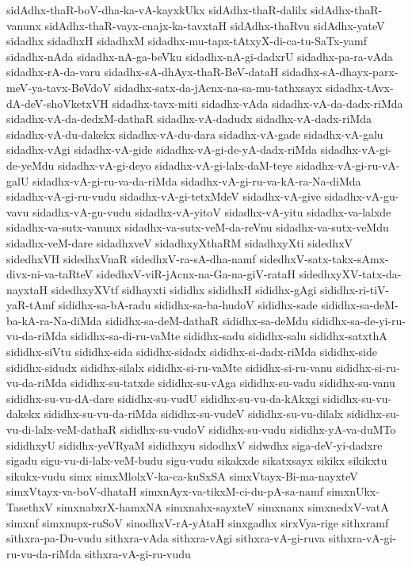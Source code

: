 {sidAdhx-thaR-boV-dha-ka-vA-kayxkUkx
sidAdhx-thaR-dalilx
sidAdhx-thaR-vanunx
sidAdhx-thaR-vayx-cnajx-ka-tavxtaH
sidAdhx-thaRvu
sidAdhx-yateV
sidadhx
sidadhxH
sidadhxM
sidadhx-mu-tapx-tAtxyX-di-ca-tu-SaTx-yamf
sidadhx-nAda
sidadhx-nA-ga-beVku
sidadhx-nA-gi-dadxrU
sidadhx-pa-ra-vAda
sidadhx-rA-da-varu
sidadhx-sA-dhAyx-thaR-BeV-dataH
sidadhx-sA-dhayx-parx-meV-ya-tavx-BeVdoV
sidadhx-satx-da-jAcnx-na-sa-mu-tathxsayx
sidadhx-tAvx-dA-deV-shoVketxVH
sidadhx-tavx-miti
sidadhx-vAda
sidadhx-vA-da-dadx-riMda
sidadhx-vA-da-dedxM-dathaR
sidadhx-vA-dadudx
sidadhx-vA-dadx-riMda
sidadhx-vA-du-dakekx
sidadhx-vA-du-dara
sidadhx-vA-gade
sidadhx-vA-galu
sidadhx-vAgi
sidadhx-vA-gide
sidadhx-vA-gi-de-yA-dadx-riMda
sidadhx-vA-gi-de-yeMdu
sidadhx-vA-gi-deyo
sidadhx-vA-gi-lalx-daM-teye
sidadhx-vA-gi-ru-vA-galU
sidadhx-vA-gi-ru-va-da-riMda
sidadhx-vA-gi-ru-va-kA-ra-Na-diMda
sidadhx-vA-gi-ru-vudu
sidadhx-vA-gi-tetxMdeV
sidadhx-vA-give
sidadhx-vA-gu-vavu
sidadhx-vA-gu-vudu
sidadhx-vA-yitoV
sidadhx-vA-yitu
sidadhx-va-lalxde
sidadhx-va-sutx-vanunx
sidadhx-va-sutx-veM-da-reVnu
sidadhx-va-sutx-veMdu
sidadhx-veM-dare
sidadhxveV
sidadhxyXthaRM
sidadhxyXti
sidedhxV
sidedhxVH
sidedhxVnaR
sidedhxV-ra-sA-dha-namf
sidedhxV-satx-takx-sAmx-divx-ni-va-taRteV
sidedhxV-viR-jAcnx-na-Ga-na-giV-rataH
sidedhxyXV-tatx-da-nayxtaH
sidedhxyXVtf
sidhayxti
sididhx
sididhxH
sididhx-gAgi
sididhx-ri-tiV-yaR-tAmf
sididhx-sa-bA-radu
sididhx-sa-ba-hudoV
sididhx-sade
sididhx-sa-deM-ba-kA-ra-Na-diMda
sididhx-sa-deM-dathaR
sididhx-sa-deMdu
sididhx-sa-de-yi-ru-vu-da-riMda
sididhx-sa-di-ru-vaMte
sididhx-sadu
sididhx-salu
sididhx-satxthA
sididhx-siVtu
sididhx-sida
sididhx-sidadx
sididhx-si-dadx-riMda
sididhx-side
sididhx-sidudx
sididhx-silalx
sididhx-si-ru-vaMte
sididhx-si-ru-vanu
sididhx-si-ru-vu-da-riMda
sididhx-su-tatxde
sididhx-su-vAga
sididhx-su-vadu
sididhx-su-vanu
sididhx-su-vu-dA-dare
sididhx-su-vudU
sididhx-su-vu-da-kAkxgi
sididhx-su-vu-dakekx
sididhx-su-vu-da-riMda
sididhx-su-vudeV
sididhx-su-vu-dilalx
sididhx-su-vu-di-lalx-veM-dathaR
sididhx-su-vudoV
sididhx-su-vudu
sididhx-yA-va-duMTo
sididhxyU
sididhx-yeVRyaM
sididhxyu
sidodhxV
sidwdhx
siga-deV-yi-dadxre
sigadu
sigu-vu-di-lalx-veM-budu
sigu-vudu
sikakxde
sikatxsayx
sikikx
sikikxtu
sikukx-vudu
simx
simxMlolxV-ka-ca-kuSxSA
simxVtayx-Bi-ma-nayxteV
simxVtayx-va-boV-dhataH
simxnAyx-va-tikxM-ci-du-pA-sa-namf
simxnUkx-TasethxV
simxnabxrX-hamxNA
simxnahx-sayxteV
simxnanx
simxnedxV-vatA
simxnf
simxnupx-ruSoV
sinodhxV-rA-yAtaH
sinxgadhx
sirxVya-rige
sithxramf
sithxra-pa-Du-vudu
sithxra-vAda
sithxra-vAgi
sithxra-vA-gi-ruva
sithxra-vA-gi-ru-vu-da-riMda
sithxra-vA-gi-ru-vudu
}
